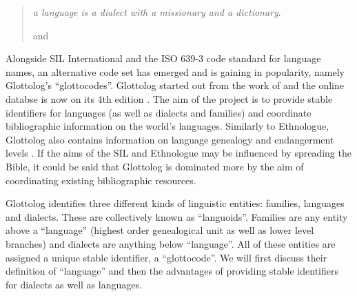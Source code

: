 \documentclass[a4paper,10pt]{article} %
\begin{document}
\begin{quotation}
\noindent \emph{a language is a dialect with a missionary and a dictionary}.
\begin{flushright}
\citet{lupkestorch2013} and \citet{blommaert2008artefactual}
\end{flushright}
\end{quotation}



Alongside SIL International and the ISO 639-3 code standard for language names, an alternative code set has emerged and is gaining in popularity, namely Glottolog's ``glottocodes''. Glottolog started out from the work of \citet{nordhoff2011glottolog} and the online databse is now on its 4th edition \citep{glottolog40}. The aim of the project is to provide stable identifiers for languages (as well as dialects and families) and coordinate bibliographic information on the world's languages. Similarly to Ethnologue, Glottolog also contains information on language genealogy and endangerment levels \citep{hammarstrom2018simultaneous}. If the aims of the SIL and Ethnologue may be influenced by spreading the Bible, it could be said that Glottolog is dominated more by the aim of coordinating existing bibliographic resources.

Glottolog identifies three different kinds of linguistic entities: families, languages and dialects. These are collectively known as ``languoids''. Families are any entity above a ``language'' (highest order genealogical unit as well as lower level branches) and dialects are anything below ``language''. All of these entities are assigned a unique stable identifier, a ``glottocode''. We will first discuss their definition of ``language'' and then the advantages of providing stable identifiers for dialects as well as languages.
\end{document}
